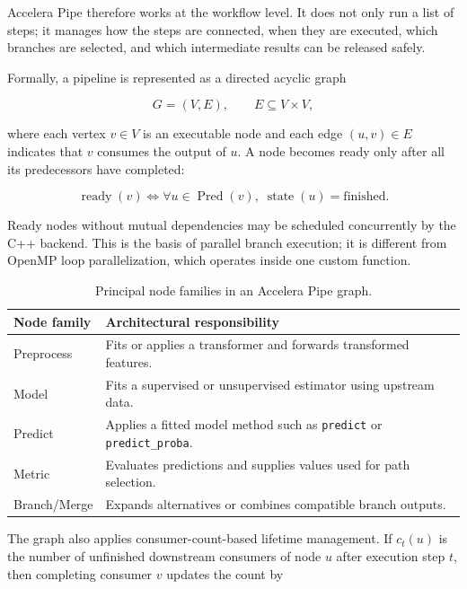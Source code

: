 \documentclass[12pt,a4paper]{report}
\newcommand{\acceleraTableStyle}{%
\small
\renewcommand{\arraystretch}{1.15}
\setlength{\tabcolsep}{4pt}%
}
\begin{document}
Accelera Pipe therefore works at the workflow level. It does not only run a list
of steps; it manages how the steps are connected, when they are executed, which
branches are selected, and which intermediate results can be released safely.

Formally, a pipeline is represented as a directed acyclic graph

\begin{equation}
G=(V,E), \qquad E\subseteq V\times V,
\end{equation}

where each vertex $v\in V$ is an executable node and each edge $(u,v)\in E$
indicates that $v$ consumes the output of $u$. A node becomes ready only after
all its predecessors have completed:

\begin{equation}
\operatorname{ready}(v)
\Longleftrightarrow
\forall u\in\operatorname{Pred}(v),\;
\operatorname{state}(u)=\text{finished}.
\label{eq:graph-node-ready}
\end{equation}

Ready nodes without mutual dependencies may be scheduled concurrently by the
C++ backend. This is the basis of parallel branch execution; it is different
from OpenMP loop parallelization, which operates inside one custom function.

\begin{table}[!htbp]
\centering
\acceleraTableStyle
\caption{Principal node families in an Accelera Pipe graph.}
\label{tab:accelera-pipe-node-families}
\begin{tabularx}{\textwidth}{p{}X}
\toprule
\textbf{Node family} & \textbf{Architectural responsibility} \\
\midrule
Preprocess & Fits or applies a transformer and forwards transformed features. \\
Model & Fits a supervised or unsupervised estimator using upstream data. \\
Predict & Applies a fitted model method such as \texttt{predict} or
\texttt{predict\_proba}. \\
Metric & Evaluates predictions and supplies values used for path selection. \\
Branch/Merge & Expands alternatives or combines compatible branch outputs. \\
\bottomrule
\end{tabularx}
\end{table}

The graph also applies consumer-count-based lifetime management. If $c_t(u)$ is
the number of unfinished downstream consumers of node $u$ after execution step
$t$, then completing consumer $v$ updates the count by
\end{document}
